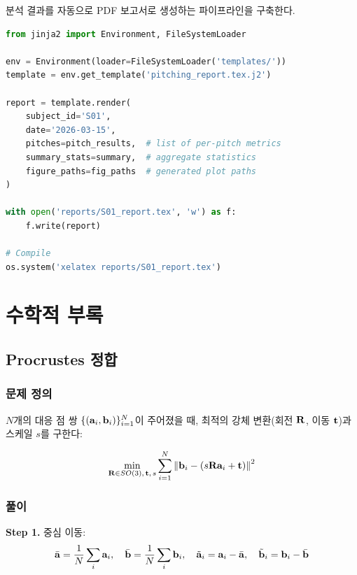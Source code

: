 \documentclass[11pt, a4paper]{report}
\begin{document}
분석 결과를 자동으로 PDF 보고서로 생성하는 파이프라인을 구축한다.

\begin{codebox}[title={Jinja2 기반 LaTeX 보고서 자동 생성}]
\begin{lstlisting}[language=Python]
from jinja2 import Environment, FileSystemLoader

env = Environment(loader=FileSystemLoader('templates/'))
template = env.get_template('pitching_report.tex.j2')

report = template.render(
    subject_id='S01',
    date='2026-03-15',
    pitches=pitch_results,  # list of per-pitch metrics
    summary_stats=summary,  # aggregate statistics
    figure_paths=fig_paths  # generated plot paths
)

with open('reports/S01_report.tex', 'w') as f:
    f.write(report)

# Compile
os.system('xelatex reports/S01_report.tex')
\end{lstlisting}
\end{codebox}


\chapter{수학적 부록}

\section{Procrustes 정합}

\subsection{문제 정의}

$N$개의 대응 점 쌍 $\{(\mathbf{a}_i, \mathbf{b}_i)\}_{i=1}^{N}$이 주어졌을 때,
최적의 강체 변환(회전 $\mathbf{R}$, 이동 $\mathbf{t}$)과 스케일 $s$를 구한다:

\begin{equation}
  \min_{\mathbf{R} \in SO(3),\, \mathbf{t},\, s} \sum_{i=1}^{N} \left\| \mathbf{b}_i - (s\mathbf{R}\mathbf{a}_i + \mathbf{t}) \right\|^2
\end{equation}

\subsection{풀이}

\textbf{Step 1.} 중심 이동:
\begin{equation}
  \bar{\mathbf{a}} = \frac{1}{N}\sum_i \mathbf{a}_i, \quad \bar{\mathbf{b}} = \frac{1}{N}\sum_i \mathbf{b}_i, \quad
  \tilde{\mathbf{a}}_i = \mathbf{a}_i - \bar{\mathbf{a}}, \quad \tilde{\mathbf{b}}_i = \mathbf{b}_i - \bar{\mathbf{b}}
\end{equation}
\end{document}
